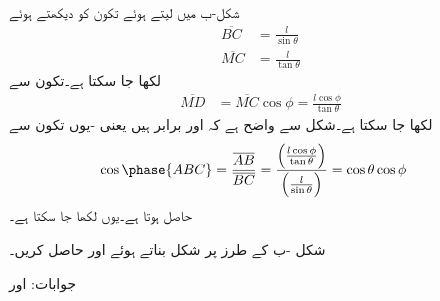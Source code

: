 شکل-ب میں  لیتے ہوئے تکون    کو دیکھتے ہوئے
\begin{align*}
\overline{BC}&=\frac{l}{\sin \theta}   \\
\overline{MC}&=\frac{l}{\tan \theta} 
\end{align*}
لکھا جا سکتا ہے۔تکون  سے
\begin{align*}
\overline{MD}&=\overline{MC} \cos \phi=\frac{l \cos \phi}{\tan \theta} 
\end{align*} 
لکھا جا سکتا ہے۔شکل سے واضح ہے کہ  اور  برابر ہیں یعنی -یوں تکون  سے
\begin{align*}
\cos \phase{ABC}&=\frac{\overline{AB}}{\overline{BC}}=\frac{\left(\frac{l \cos \phi}{\tan \theta}\right)}{\left(\frac{l}{\sin \theta}\right)}=\cos \theta \cos \phi
\end{align*}
حاصل ہوتا ہے۔یوں  لکھا جا سکتا ہے۔

شکل -ب کے طرز پر شکل بناتے ہوئے  اور  حاصل کریں۔

جوابات: اور 
